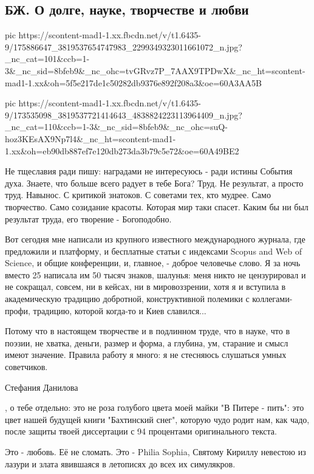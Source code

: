  
 
 
 
 

\subsection{БЖ. О долге, науке, творчестве и любви}
\label{sec:20_04_2021.fb.bilchenko_evgenia.1.trud_bog_duh}


\ifcmt
  pic https://scontent-mad1-1.xx.fbcdn.net/v/t1.6435-9/175886647_3819537654747983_2299349323011661072_n.jpg?_nc_cat=101&ccb=1-3&_nc_sid=8bfeb9&_nc_ohc=tvGRvz7P_7AAX9TPDwX&_nc_ht=scontent-mad1-1.xx&oh=5f5e217de1c50282db9376e892f208a3&oe=60A3AA5B

  pic https://scontent-mad1-1.xx.fbcdn.net/v/t1.6435-9/173535098_3819537721414643_4838824223113964409_n.jpg?_nc_cat=110&ccb=1-3&_nc_sid=8bfeb9&_nc_ohc=suQ-hoz3KEsAX9Np7l4&_nc_ht=scontent-mad1-1.xx&oh=eb90db887ef7e120db273da3b79c5e72&oe=60A49BE2
\fi

Не тщеславия ради пишу: наградами не интересуюсь - ради истины События духа.
Знаете, что больше всего радует в тебе Бога? Труд. Не результат, а просто труд.
Навынос. С критикой знатоков. С советами тех, кто мудрее. Само творчество. Само
созидание красоты. Которая мир таки спасет. Каким бы ни был результат труда,
его творение - Богоподобно.

Вот сегодня мне написали из крупного известного международного журнала, где
предложили и платформу, и бесплатные статьи с индексами Scopus and Web of
Science, и общие конференции, и, главное, - доброе человечье слово. Я за ночь
вместо 25 написала им 50 тысяч знаков, шалунья: меня никто не цензурировал и не
сокращал, совсем, ни в кейсах, ни в мировоззрении, хотя я и вступила в
академическую традицию добротной, конструктивной полемики с коллегами-профи,
традицию, которой когда-то и Киев славился...

Потому что в настоящем творчестве и в подлинном труде, что в науке, что в
поэзии, не хватка, деньги, размер и форма, а глубина, ум, старание и смысл
имеют значение. Правила работу я много: я не стесняюсь слушаться умных
советчиков. 

Стефания Данилова

 , о тебе отдельно: это не роза голубого цвета моей майки "В Питере - пить":
 это цвет нашей будущей книги "Бахтинский снег", которую чудо родит нам, как
 чадо, после защиты твоей диссертации с 94 процентами оригинального текста. 

Это - любовь. Её не сломать. Это - Philia Sophia, Святому Кириллу невестою из
лазури и злата явившаяся в летописях до всех их симулякров.
